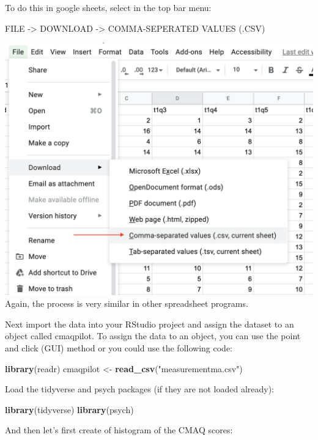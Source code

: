\documentclass[
]{book}
\newenvironment{Shaded}{\begin{snugshade}}{\end{snugshade}}
\newcommand{\KeywordTok}[1]{\textcolor[rgb]{0.13,0.29,0.53}{\textbf{#1}}}
\newcommand{\NormalTok}[1]{#1}
\newcommand{\StringTok}[1]{\textcolor[rgb]{0.31,0.60,0.02}{#1}}
\begin{document}
To do this in google sheets, select in the top bar menu:

FILE -\textgreater{} DOWNLOAD -\textgreater{} COMMA-SEPERATED VALUES (.CSV)

\includegraphics{img/savecsv.png}
Again, the process is very similar in other spreadsheet programs.

Next import the data into your RStudio project and assign the dataset to an object called cmaqpilot. To assign the data to an object, you can use the point and click (GUI) method or you could use the following code:

\begin{Shaded}
\begin{Highlighting}[]
\KeywordTok{library}\NormalTok{(readr)}
\NormalTok{cmaqpilot <-}\StringTok{ }\KeywordTok{read_csv}\NormalTok{(}\StringTok{"measurementma.csv"}\NormalTok{)}
\end{Highlighting}
\end{Shaded}

Load the tidyverse and psych packages (if they are not loaded already):

\begin{Shaded}
\begin{Highlighting}[]
\KeywordTok{library}\NormalTok{(tidyverse)}
\KeywordTok{library}\NormalTok{(psych)}
\end{Highlighting}
\end{Shaded}

And then let's first create of histogram of the CMAQ scores:
\end{document}
